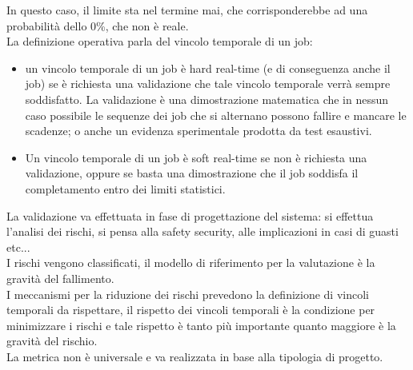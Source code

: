 \documentclass{article}
\begin{document}
In questo caso, il limite sta nel termine mai, che corrisponderebbe ad una probabilità dello 0\%, che non è reale.\\ La definizione operativa parla del vincolo temporale di un job:
\begin{itemize}
\item un vincolo temporale di un job è hard real-time (e di conseguenza anche il job) se è richiesta una validazione che tale vincolo temporale verrà sempre soddisfatto. La validazione è una dimostrazione matematica che in nessun caso possibile le sequenze dei job che si alternano possono fallire e mancare le scadenze; o anche un evidenza sperimentale prodotta da test esaustivi.
\item Un vincolo temporale di un job è soft real-time se non è richiesta una validazione, oppure se basta una dimostrazione che il job soddisfa il completamento entro dei limiti statistici.
\end{itemize}
La validazione va effettuata in fase di progettazione del sistema: si effettua l'analisi dei rischi, si pensa alla safety security, alle implicazioni in casi di guasti etc...\\ I rischi vengono classificati, il modello di riferimento per la valutazione è la gravità del fallimento.\\ I meccanismi per la riduzione dei rischi prevedono la definizione di vincoli temporali da rispettare, il rispetto dei vincoli temporali è la condizione per minimizzare i rischi e tale rispetto è tanto più importante quanto maggiore è la gravità del rischio.\\ La metrica non è universale e va realizzata in base alla tipologia di progetto.
\end{document}
